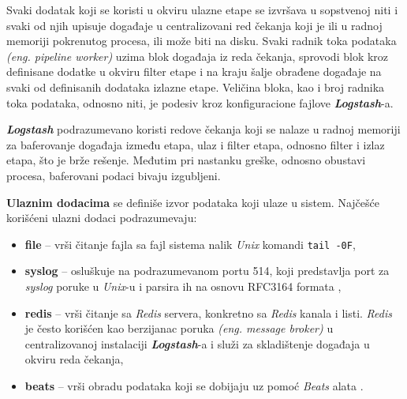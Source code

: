 \par
Svaki dodatak koji se koristi u okviru ulazne etape se izvršava u sopstvenoj niti i svaki od njih upisuje događaje u centralizovani red čekanja koji je ili u radnoj memoriji pokrenutog procesa, ili može biti na disku. Svaki radnik toka podataka \textit{(eng. pipeline worker)} uzima blok događaja iz reda čekanja, sprovodi blok kroz definisane dodatke u okviru filter etape i na kraju šalje obrađene događaje na svaki od definisanih dodataka izlazne etape. Veličina bloka, kao i broj radnika toka podataka, odnosno niti, je podesiv kroz konfiguracione fajlove \textit{\textbf{Logstash}}-a.

\par
\textit{\textbf{Logstash}} podrazumevano koristi redove čekanja koji se nalaze u radnoj memoriji za baferovanje događaja između etapa, ulaz i filter etapa, odnosno filter i izlaz etapa, što je brže rešenje. Međutim pri nastanku greške, odnosno obustavi procesa, baferovani podaci bivaju izgubljeni.

\par
\textbf{Ulaznim dodacima} se definiše izvor podataka koji ulaze u sistem. Najčešće korišćeni ulazni dodaci podrazumevaju:
\begin{itemize}
\item \textbf{file} – vrši čitanje fajla sa fajl sistema nalik \textit{Unix} komandi \texttt{tail -0F},
\item \textbf{syslog} – osluškuje na podrazumevanom portu 514, koji predstavlja port za \textit{syslog} poruke u \textit{Unix}-u i parsira ih na osnovu RFC3164 formata \cite{syslog-protocol},
\item \textbf{redis} – vrši čitanje sa \textit{Redis} servera, konkretno sa \textit{Redis} kanala i listi. \textit{Redis} \cite{redis} je često korišćen kao berzijanac poruka \textit{(eng. message broker)} u centralizovanoj instalaciji \textit{\textbf{Logstash}}-a i služi za skladištenje događaja u okviru reda čekanja,
\item \textbf{beats} – vrši obradu podataka koji se dobijaju uz pomoć \textit{Beats} alata \cite{elastic-beats}.
\end{itemize}


